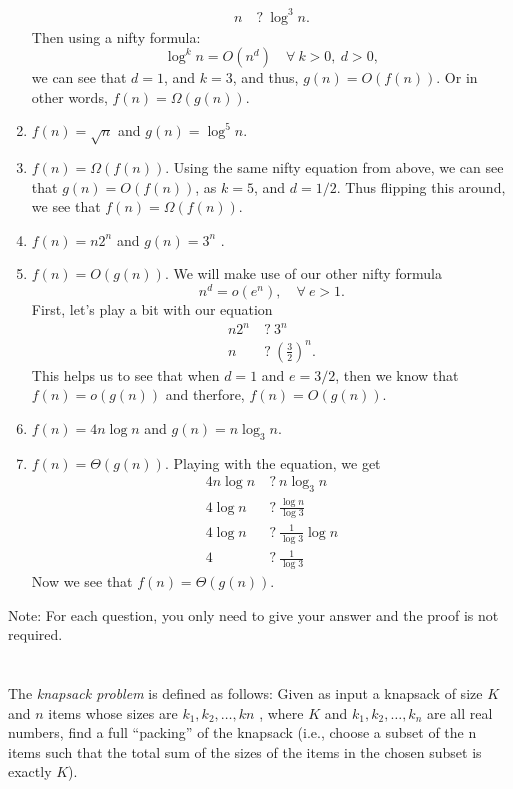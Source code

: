 \documentclass{article}
\begin{document}
\begin{enumerate}[label=(\alph*)]
\begin{equation}
\begin{split}
      n &\: ? \: \log^3 n.
    \end{split}
  \end{equation}
Then using a nifty formula:
  \begin{equation}
    \log^k n = O(n^d) \quad \forall\: k>0, \: d > 0,
  \end{equation}
we can see that $d = 1$, and $k = 3$, and thus, $g(n) = O(f(n))$. 
Or in other words, $f(n) = \Omega(g(n))$.
\item $f (n) =\sqrt{n}$ and $g(n) = \log^5 n$.
\item[] $f(n) = \Omega(f(n))$. Using the same nifty equation from
  above, we can see that $g(n) = O(f(n))$, as $k = 5$, and $d = 1/2$.
  Thus flipping this around, we see that $f(n) = \Omega(f(n))$.
\item $f (n) = n2^n$ and $g(n) = 3^n$ .
\item[] $f(n) = O(g(n))$.  We will make use of our other nifty
  formula 
  \begin{equation}
    n^d = o(e^n), \quad \forall\: e > 1.
  \end{equation}
First, let's play a bit with our equation
\begin{equation}
\begin{split}
  n2^n &\: ?\: 3^n\\
  n &\: ? \:  \left(\frac{3}{2}\right)^n.
\end{split}
\end{equation}
This helps us to see that when $d = 1$ and $ e = 3/2$, then 
we know that $f(n) = o(g(n))$ and therfore, $f(n) = O(g(n))$.
\item $f (n) = 4n \log n$ and $g(n) = n \log_3 n$.
\item[] $f(n) = \Theta(g(n))$. Playing with the equation, we get
  \begin{equation}
    \begin{split}
    4n \log n &\: ? \: n \log_3 n\\
    4 \log n &\: ? \: \frac{\log n}{\log 3}\\
    4 \log n &\: ? \: \frac{1}{\log 3} \log n\\
    4 &\: ? \: \frac{1}{\log 3}
    \end{split}
  \end{equation}
Now we see that $f(n) = \Theta(g(n))$.
\end{enumerate}


Note: For each question, you only need to give your answer and the
proof is not required. 


\section{}
The \emph{knapsack problem} is defined as follows: Given as input a
knapsack of size $K$ and $n$ items whose sizes are $k_1 , k_2 ,
\dots , kn$ , where $K$ and $k_1 , k_2 , \dots , k_n$ are all real
numbers, find a full ``packing'' of the knapsack (i.e., choose a
subset of the n items such that the total sum of the sizes of the
items in the chosen subset is exactly $K$). 
\end{document}
